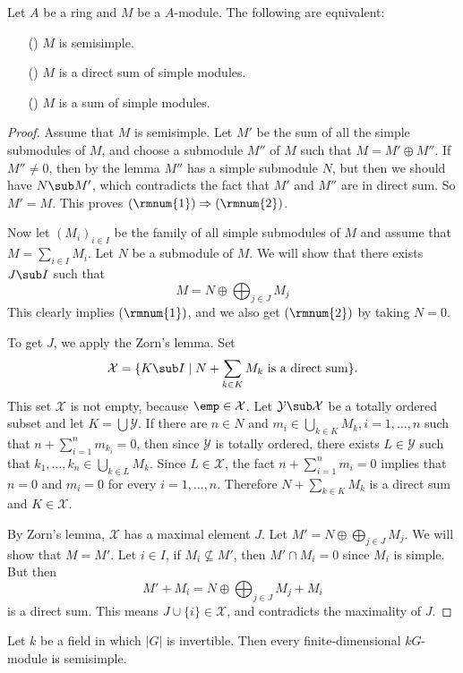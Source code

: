 \begin{theorem}\label{semisimple module iff}
Let $A$ be a ring and $M$ be a $A$-module. The following are equivalent:
\begin{itemize}
\item[(\rmnum{1})] $M$ is semisimple.
\item[(\rmnum{2})] $M$ is a direct sum of simple modules.
\item[(\rmnum{3})] $M$ is a sum of simple modules.
\end{itemize}
\end{theorem}
\begin{proof}
Assume that $M$ is semisimple. Let $M'$ be the sum of all the simple submodules of $M$, and choose a submodule $M''$ of $M$ such that $M=M'\oplus M''$. If $M''\neq 0$, then by the lemma $M''$ has a simple submodule $N$, but then we should have $N\sub M'$, which contradicts the fact that $M'$ and $M''$ are in direct sum. So $M'=M$. This proves $(\rmnum{1})\Rightarrow(\rmnum{2})$.\par
Now let $(M_i)_{i\in I}$ be the family of all simple submodules of $M$ and assume that $M=\sum_{i\in I}M_i$. Let $N$ be a submodule of $M$. We will show that there exists $J\sub I$ such that
\[M=N\oplus\bigoplus_{j\in J}M_j\]
This clearly implies $(\rmnum{1})$, and we also get $(\rmnum{2})$ by taking $N=0$.\par
To get $J$, we apply the Zorn's lemma. Set
\[\mathcal{X}=\{K\sub I\mid\text{$N+\sum_{k\in K}M_k$ is a direct sum}\}.\]
This set $\mathcal{X}$ is not empty, because $\emp\in\mathcal{X}$. Let $\mathcal{Y}\sub\mathcal{X}$ be a totally ordered subset and let $K=\bigcup\mathcal{Y}$. If there are $n\in N$ and $m_{i}\in\bigcup_{k\in K}M_{k},i=1,\dots,n$ such that $n+\sum_{i=1}^{n}m_{k_i}=0$, then since $\mathcal{Y}$ is totally ordered, there exists $L\in\mathcal{Y}$ such that $k_1,\dots,k_n\in\bigcup_{k\in L}M_k$. Since $L\in\mathcal{X}$, the fact $n+\sum_{i=1}^{n}m_{i}=0$ implies that $n=0$ and $m_i=0$ for every $i=1,\dots,n$. Therefore $N+\sum_{k\in K}M_k$ is a direct sum and $K\in\mathcal{X}$.\par
By Zorn's lemma, $\mathcal{X}$ has a maximal element $J$. Let $M'=N\oplus\bigoplus_{j\in J}M_j$. We will show that $M=M'$. Let $i\in I$, if $M_i\nsubseteq M'$, then $M'\cap M_i=0$ since $M_i$ is simple. But then
\[M'+M_i=N\oplus\bigoplus_{j\in J}M_j+M_i\]
is a direct sum. This means $J\cup\{i\}\in\mathcal{X}$, and contradicts the maximality of $J$.
\end{proof}
\begin{corollary}
Let $k$ be a field in which $|G|$ is invertible. Then every finite-dimensional $kG$-module is semisimple.
\end{corollary}
